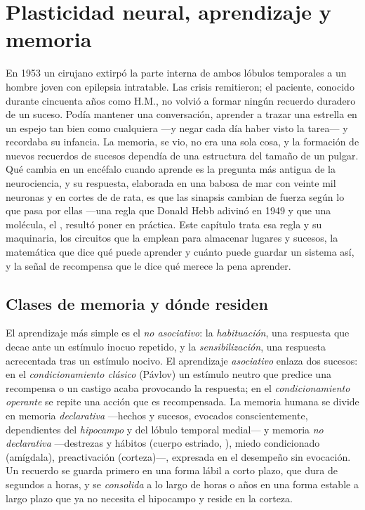 \chapter{Plasticidad neural, aprendizaje y memoria}\label{ch:b3:learning-memory}

En 1953 un cirujano extirpó la parte interna de ambos lóbulos
temporales a un hombre joven con epilepsia intratable. Las crisis
remitieron; el paciente, conocido durante cincuenta años como H.M., no
volvió a formar ningún recuerdo duradero de un suceso. Podía mantener
una conversación, aprender a trazar una estrella en un espejo tan bien
como cualquiera ---y negar cada día haber visto la tarea--- y recordaba
su infancia. La memoria, se vio, no era una sola cosa, y la formación
de nuevos recuerdos de sucesos dependía de una estructura del tamaño de
un pulgar. Qué cambia en un encéfalo cuando aprende es la pregunta más
antigua de la neurociencia, y su respuesta, elaborada en una babosa de
mar con veinte mil neuronas y en cortes de  de rata, es que
las sinapsis cambian de fuerza según lo que pasa por ellas ---una regla
que Donald Hebb adivinó en 1949 y que una molécula, el ,
resultó poner en práctica. Este capítulo trata esa regla y su
maquinaria, los circuitos que la emplean para almacenar lugares y
sucesos, la matemática que dice qué puede aprender y cuánto puede
guardar un sistema así, y la señal de recompensa que le dice qué merece
la pena aprender.

\section{Clases de memoria y dónde residen}

\begin{definition}\label{def:b3:learning-memory:kinds}
El aprendizaje más simple es el \emph{no asociativo}: la
\emph{habituación}, una respuesta que decae ante un estímulo inocuo
repetido, y la \emph{sensibilización}, una respuesta acrecentada tras
un estímulo nocivo. El aprendizaje \emph{asociativo} enlaza dos
sucesos: en el \emph{condicionamiento clásico} (Pávlov) un estímulo
neutro que predice una recompensa o un castigo acaba provocando la
respuesta; en el \emph{condicionamiento operante} se repite una acción
que es recompensada. La memoria humana se divide en memoria
\emph{declarativa} ---hechos y sucesos, evocados conscientemente,
dependientes del \emph{hipocampo} y del lóbulo temporal medial--- y
memoria \emph{no declarativa} ---destrezas y hábitos (cuerpo estriado,
), miedo condicionado (amígdala), preactivación (corteza)---,
expresada en el desempeño sin evocación. Un recuerdo se guarda primero
en una forma lábil a corto plazo, que dura de segundos a horas, y se
\emph{consolida} a lo largo de horas o años en una forma estable a
largo plazo que ya no necesita el hipocampo y reside en la corteza.
\end{definition}

